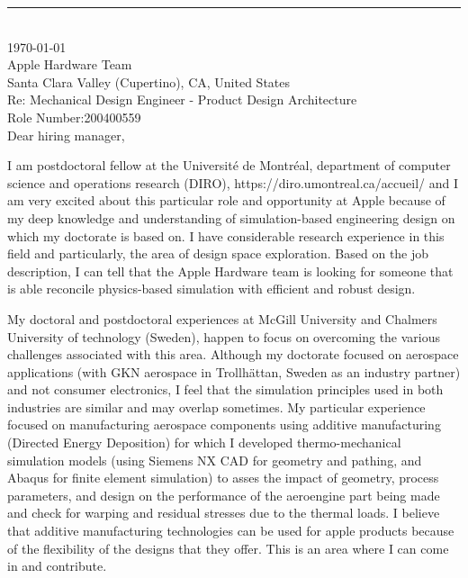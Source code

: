 \documentclass[12pt]{article} %
\begin{document}
\medskip %
\rule[0pt]{\textwidth}{1pt}\\
\today\\[6pt]


Apple Hardware Team\\
Santa Clara Valley (Cupertino), CA, United States\\
Re: Mechanical Design Engineer - Product Design Architecture\\
Role Number:200400559\\[6pt] \medskip
Dear hiring manager,

\medskip %

I am postdoctoral fellow at the Université de Montréal, department of computer science and operations research (DIRO), https://diro.umontreal.ca/accueil/ and I am very excited about this particular role and opportunity at Apple because  of my deep knowledge and understanding of simulation-based engineering design on which my doctorate is based on. I have considerable research experience in this field and particularly, the area of design space exploration. Based on the job description, I can tell that the Apple Hardware team is looking for someone that is able reconcile physics-based simulation with efficient and robust design.

\medskip %

My doctoral and postdoctoral experiences at McGill University and Chalmers University of technology (Sweden), happen to focus on overcoming the various challenges associated with this area. Although my doctorate focused on aerospace applications (with GKN aerospace in Trollhättan, Sweden as an industry partner) and not consumer electronics, I feel that the simulation principles used in both industries are similar and may overlap sometimes. My particular experience focused on manufacturing aerospace components using additive manufacturing (Directed Energy Deposition) for which I developed thermo-mechanical simulation models (using Siemens NX CAD for geometry and pathing, and Abaqus for finite element simulation) to asses the impact of geometry, process parameters, and design on the performance of the aeroengine part being made and check for warping and residual stresses due to the thermal loads. I believe that additive manufacturing technologies can be used for apple products because of the flexibility of the designs that they offer. This is an area where I can come in and contribute. 
\end{document}
